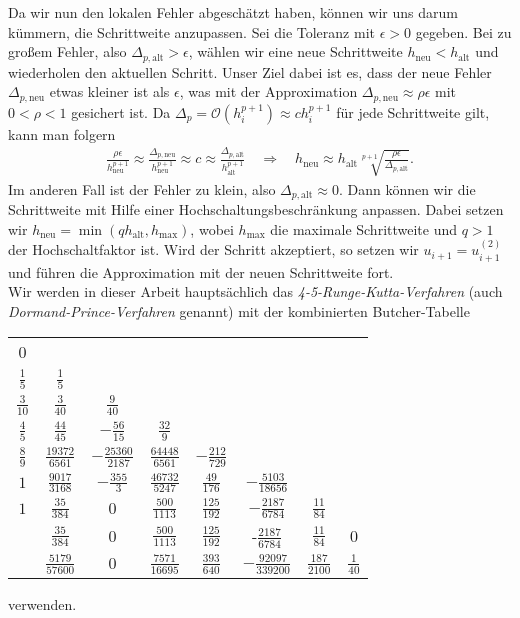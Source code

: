 Da wir nun den lokalen Fehler abgeschätzt haben, können wir uns darum kümmern, die Schrittweite anzupassen. Sei die
Toleranz mit $\epsilon>0$ gegeben. Bei zu großem Fehler, also $\Delta_{p, \text{alt}} > \epsilon$, wählen wir eine neue
Schrittweite $h_{\text{neu}}<h_{\text{alt}}$ und wiederholen den aktuellen Schritt. Unser Ziel dabei ist es, dass der
neue Fehler $\Delta_{p, \text{neu}}$ etwas kleiner ist als $\epsilon$, was mit der Approximation $\Delta_{p, \text{neu}} \approx \rho \epsilon$ mit
$0 < \rho < 1$ gesichert ist. Da $\Delta_p = \mathcal{O}(h_i^{p+1}) \approx ch_i^{p+1}$ für jede Schrittweite gilt, kann man folgern
\begin{align*}
    \frac{\rho \epsilon}{h_{\text{neu}}^{p+1}}
    \approx \frac{\Delta_{p, \text{neu}}}{h_{\text{neu}}^{p+1}}
    \approx c
    \approx \frac{\Delta_{p, \text{alt}}}{h_{\text{alt}}^{p+1}}
    \quad \Rightarrow \quad
    h_{\text{neu}} \approx h_{\text{alt}} \sqrt[p+1]{\frac{\rho \epsilon}{\Delta_{p, \text{alt}}}}.
\end{align*}
Im anderen Fall ist der Fehler zu klein, also $\Delta_{p, \text{alt}} \approx 0$. Dann können wir die Schrittweite mit Hilfe
einer Hochschaltungsbeschränkung anpassen. Dabei setzen wir $h_{\text{neu}} = \min(q h_{\text{alt}}, h_{\text{max}})$,
wobei $h_{\text{max}}$ die maximale Schrittweite und $q>1$ der Hochschaltfaktor ist. Wird der Schritt akzeptiert, so
setzen wir $u_{i+1} = u_{i+1}^{(2)}$ und führen die Approximation mit der neuen Schrittweite fort.\\
Wir werden in dieser Arbeit hauptsächlich das \textit{4-5-Runge-Kutta-Verfahren}
(auch \textit{Dormand-Prince-Verfahren} genannt) mit der kombinierten Butcher-Tabelle
\begin{center}
    \begin{tabular}{c | c c c c c c c}
        0 & & & & & & & \\
        $\frac{1}{5}$ & $\frac{1}{5}$ & & & & & & \\
        $\frac{3}{10}$ & $\frac{3}{40}$ & $\frac{9}{40}$ & & & & & \\
        $\frac{4}{5}$ & $\frac{44}{45}$ & $-\frac{56}{15}$ & $\frac{32}{9}$ & & & & \\
        $\frac{8}{9}$ & $\frac{19372}{6561}$ & $-\frac{25360}{2187}$ & $\frac{64448}{6561}$ & $-\frac{212}{729}$ & & & \\
        $1$ & $\frac{9017}{3168}$ & $-\frac{355}{3}$ & $\frac{46732}{5247}$ & $\frac{49}{176}$ & $-\frac{5103}{18656}$ & & \\
        $1$ & $\frac{35}{384}$ & $0$ & $\frac{500}{1113}$ & $\frac{125}{192}$ & $-\frac{2187}{6784}$ & $\frac{11}{84}$ & \\
        \hline
        & $\frac{35}{384}$ & $0$ & $\frac{500}{1113}$ & $\frac{125}{192}$ & -$\frac{2187}{6784}$ & $\frac{11}{84}$ & $0$\\
        \hline
        & $\frac{5179}{57600}$ &  $0$ & $\frac{7571}{16695}$ & $\frac{393}{640}$ & $-\frac{92097}{339200}$
        & $\frac{187}{2100}$ & $\frac{1}{40}$ \\
    \end{tabular}
\end{center}
verwenden.

